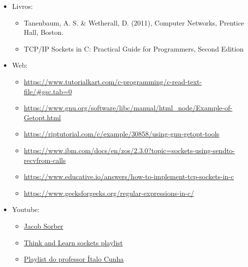 \documentclass{article}
\begin{document}
\begin{itemize}
      \item Livros:
            \begin{itemize}
                  \item Tanenbaum, A. S. \& Wetherall, D. (2011), Computer
                        Networks, Prentice Hall, Boston.
                  \item TCP/IP Sockets in C\@: Practical Guide for Programmers,
                        Second Edition
            \end{itemize}

      \item Web:
            \begin{itemize}
                  \item

                        \url{https://www.tutorialkart.com/c-programming/c-read-text-file/#gsc.tab=0}
                  \item

                        \url{https://www.gnu.org/software/libc/manual/html_node/Example-of-Getopt.html}
                  \item

                        \url{https://riptutorial.com/c/example/30858/using-gnu-getopt-tools}
                  \item

                        \url{https://www.ibm.com/docs/en/zos/2.3.0?topic=sockets-using-sendto-recvfrom-calls}
                  \item

                        \url{https://www.educative.io/answers/how-to-implement-tcp-sockets-in-c}
                  \item

                        \url{https://www.geeksforgeeks.org/regular-expressions-in-c/}
            \end{itemize}

      \item Youtube:
            \begin{itemize}
                  \item \href{https://www.youtube.com/@JacobSorber}{Jacob
                              Sorber}
                  \item

                        \href{https://www.youtube.com/watch?v=_lQ-3S4fJ0U&list=PLPyaR5G9aNDvs6TtdpLcVO43_jvxp4emI}{Think
                              and Learn sockets playlist}
                  \item

                        \href{https://www.youtube.com/watch?v=tJ3qNtv0HVs&t=2s}{Playlist do professor
                              Ítalo Cunha}
            \end{itemize}

\end{itemize}
\end{document}
